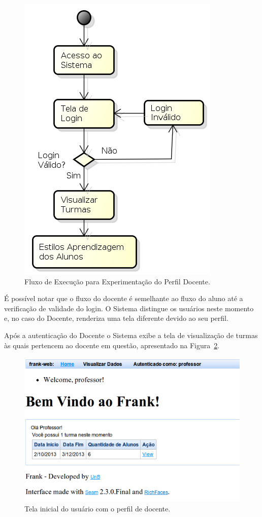 \begin{figure}
	\centering
	\includegraphics[scale=0.6]{images/fluxo-docente.png}
	\caption{Fluxo de Execução para Experimentação do Perfil Docente.}
	\label{fig:fluxo-aluno}
\end{figure}

É possível notar que o fluxo do docente é semelhante ao fluxo do aluno até a verificação de validade do login. O Sistema distingue os usuários neste momento e, no caso do Docente, renderiza uma tela diferente devido ao seu perfil. 

Após a autenticação do Docente o Sistema exibe a tela de visualização de turmas às quais pertencem ao docente em questão, apresentado na Figura~\ref{fig:frank-tela-professor-acesso}.

\begin{figure}
	\centering
	\includegraphics[scale=0.6]{images/frank-tela-professor-acesso.png}
	\caption{Tela inicial do usuário com o perfil de docente.}
	\label{fig:frank-tela-professor-acesso}
\end{figure}

